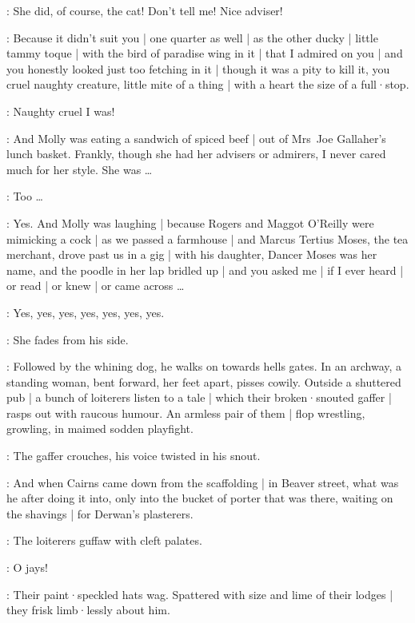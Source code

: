 \MrsBreen:
She did,
of course,
the cat!
Don't tell me!
Nice adviser!

\Bloom:
Because it didn't suit you |
one quarter as well |
as the other ducky |
little tammy toque |
with the bird of paradise wing in it |
that I admired on you |
and you honestly looked just too fetching in it |
though it was a pity to kill it,
you cruel naughty creature,
little mite of a thing |
with a heart the size of a full·stop.%

\MrsBreen:
Naughty cruel I was!

\Bloom:
And Molly was eating a sandwich of spiced beef |
out of Mrs~Joe Gallaher's lunch basket.
Frankly,
though she had her advisers or admirers,
I never cared much for her style.
She was \ldots

\MrsBreen:
Too \ldots

\Bloom:
Yes.
And Molly was laughing |
because Rogers and Maggot O'Reilly were mimicking a cock |
as we passed a farmhouse |
and Marcus Tertius Moses,
the tea merchant,
drove past us in a gig |
with his daughter,
Dancer Moses was her name,
and the poodle in her lap bridled up |
and you asked me |
if I ever heard |
or read |
or knew |
or came across \ldots

\MrsBreen:
Yes,
yes,
yes,
yes,
yes,
yes,
yes.

:
She fades from his side.

:
Followed by the whining dog,
he walks on towards hells gates.
In an archway,
a standing woman,
bent forward,
her feet apart,
pisses cowily.
Outside a shuttered pub |
a bunch of loiterers
listen to a tale |
which their broken·snouted gaffer |
rasps out with raucous humour.
An armless pair of them |
flop wrestling,
growling,
in maimed sodden playfight.

:
The gaffer crouches,
his voice twisted in his snout.

\Gaffer:
And when Cairns came down from the scaffolding |
in Beaver street,
what was he after doing it into,
only into the bucket of porter that was there,
waiting on the shavings |
for Derwan's plasterers.

:
The loiterers guffaw with cleft palates.

\Loiterers:
O jays!

:
Their paint·speckled hats wag.
Spattered with size and lime of their lodges |
they frisk limb·lessly about him.

